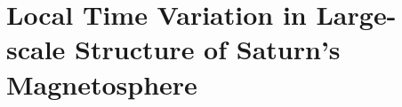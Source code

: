 \chapter{Local Time Variation in Large-scale Structure of Saturn's Magnetosphere}
\label{chap:LTsectors}

\blindtext
